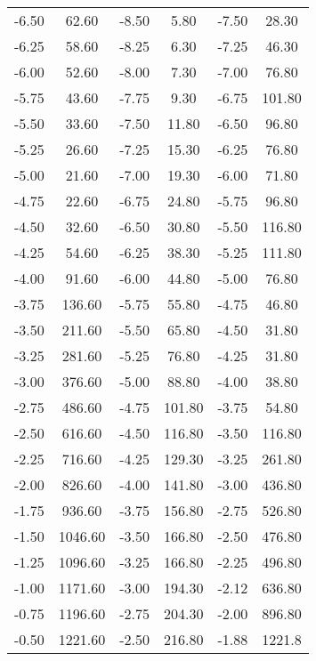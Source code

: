 \begin{longtable}{S[table-format=3.2] S[table-format=3.2] S[table-format=3.2] S[table-format=3.2] S[table-format=3.2] S[table-format=3.2]}
                -6.50 & 62.60 & -8.50 & 5.80 & -7.50 & 28.30\\
                -6.25 & 58.60 & -8.25 & 6.30 & -7.25 & 46.30\\
                -6.00 & 52.60 & -8.00 & 7.30 & -7.00 & 76.80\\
                -5.75 & 43.60 & -7.75 & 9.30 & -6.75 & 101.80\\
                -5.50 & 33.60 & -7.50 & 11.80 & -6.50 & 96.80\\
                -5.25 & 26.60 & -7.25 & 15.30 & -6.25 & 76.80\\
                -5.00 & 21.60 & -7.00 & 19.30 & -6.00 & 71.80\\
                -4.75 & 22.60 & -6.75 & 24.80 & -5.75 & 96.80\\
                -4.50 & 32.60 & -6.50 & 30.80 & -5.50 & 116.80\\
                -4.25 & 54.60 & -6.25 & 38.30 & -5.25 & 111.80\\
                -4.00 & 91.60 & -6.00 & 44.80 & -5.00 & 76.80\\
                -3.75 & 136.60 & -5.75 & 55.80 & -4.75 & 46.80\\
                -3.50 & 211.60 & -5.50 & 65.80 & -4.50 & 31.80\\
                -3.25 & 281.60 & -5.25 & 76.80 & -4.25 & 31.80\\
                -3.00 & 376.60 & -5.00 & 88.80 & -4.00 & 38.80\\
                -2.75 & 486.60 & -4.75 & 101.80 & -3.75 & 54.80\\
                -2.50 & 616.60 & -4.50 & 116.80 & -3.50 & 116.80\\
                -2.25 & 716.60 & -4.25 & 129.30 & -3.25 & 261.80\\
                -2.00 & 826.60 & -4.00 & 141.80 & -3.00 & 436.80\\
                -1.75 & 936.60 & -3.75 & 156.80 & -2.75 & 526.80\\
                -1.50 & 1046.60 & -3.50 & 166.80 & -2.50 & 476.80\\
                -1.25 & 1096.60 & -3.25 & 166.80 & -2.25 & 496.80\\
                -1.00 & 1171.60 & -3.00 & 194.30 & -2.12 & 636.80\\
                -0.75 & 1196.60 & -2.75 & 204.30 & -2.00 & 896.80\\
                -0.50 & 1221.60 & -2.50 & 216.80 & -1.88 & 1221.8\\

\end{longtable}
